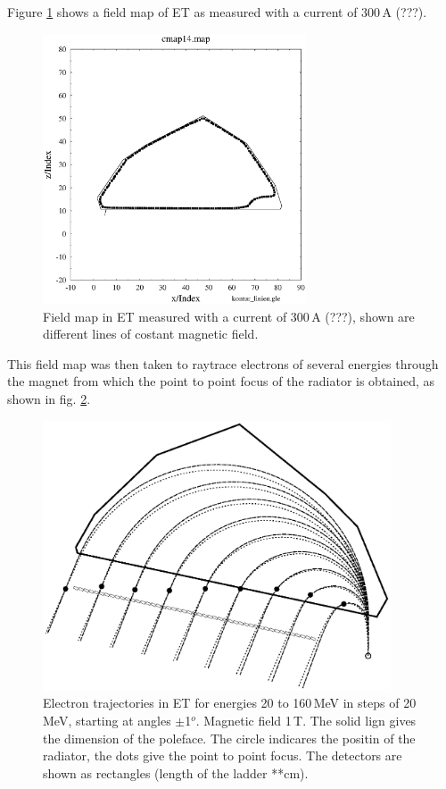 Figure \ref{map14} shows a field map of ET as measured with a current of
300\,A (???). \\
\begin{figure}
\begin{center}
\includegraphics[height=8cm]{./et_map14.eps}
\vspace*{-1cm}
\end{center}
\caption[*]{Field map in ET measured with a current of 300\,A (???),
shown are different lines of costant magnetic field.}
\label{map14}
\end{figure}
This field map was then taken to raytrace electrons of several energies
through the magnet from which the point to point focus of the 
radiator is obtained,
as shown in fig. \ref{trajet}.

\begin{figure}
\begin{center}
\includegraphics[height=8cm]{./et_raytrace.eps}
\vspace*{-1cm}
\end{center}
\caption{Electron trajectories in ET for energies 20 to 160\,MeV in 
steps of 20\,MeV, starting at angles $\pm$1$^o$. Magnetic field 1\,T.
The solid lign gives the dimension of the poleface. 
The circle indicares the positin of the 
radiator, the dots give the point to point focus. 
The detectors are shown as rectangles (length of the ladder **cm).}
\label{trajet}
\end{figure}


